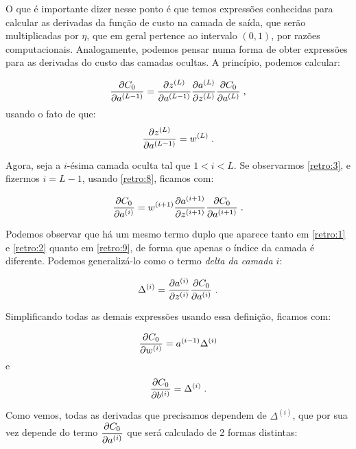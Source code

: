 O que é importante dizer nesse ponto é que temos expressões conhecidas para calcular as derivadas da função de custo na camada de saída, que serão multiplicadas por $\eta$, que em geral pertence ao intervalo $(0,1)$, por razões computacionais. Analogamente, podemos pensar numa forma de obter expressões para as derivadas do custo das camadas ocultas. A princípio, podemos calcular:

\begin{equation}\label{retro:3}
\frac{\partial C_0}{\partial a^{(L-1)}} = \frac{\partial z^{(L)}}{\partial a^{(L-1)}} \frac{\partial a^{(L)}}{\partial z^{(L)}} \frac{\partial C_0}{\partial a^{(L)}} \; ,
\end{equation}
usando o fato de que:
\begin{equation}\label{retro:8}
\frac{\partial z^{(L)}}{\partial a^{(L-1)}} = w^{(L)} \; .
\end{equation}

Agora, seja a $i$-ésima camada oculta tal que $1 < i < L$. Se observarmos \eqref{retro:3}, e fizermos $i = L-1$, usando \eqref{retro:8}, ficamos com:

\begin{equation}\label{retro:9}
\frac{\partial C_0}{\partial a^{(i)}} = w^{(i+1)} \frac{\partial a^{(i+1)}}{\partial z^{(i+1)}} \frac{\partial C_0}{\partial a^{(i+1)}} \;.
\end{equation}

Podemos observar que há um mesmo termo duplo que aparece tanto em \eqref{retro:1} e \eqref{retro:2} quanto em \eqref{retro:9}, de forma que apenas o índice da camada é diferente. Podemos generalizá-lo como o termo \emph{delta da camada $i$}:

\begin{equation}\label{retro:12}
\Delta^{(i)} = \dfrac{\partial a^{(i)}}{\partial z^{(i)}} \dfrac{\partial C_0}{\partial a^{(i)}} \;.
\end{equation}

Simplificando todas as demais expressões usando essa definição, ficamos com:

\begin{equation}\label{retro:13}
\frac{\partial C_0}{\partial w^{(i)}} = a^{(i-1)} \Delta^{(i)}
\end{equation}
e
\begin{equation}\label{retro:14}
\frac{\partial C_0}{\partial b^{(i)}} = \Delta^{(i)} \;.
\end{equation}

Como vemos, todas as derivadas que precisamos dependem de $\Delta^{(i)}$, que por sua vez depende do termo $\dfrac{\partial C_0}{\partial a^{(i)}}$ que será calculado de 2 formas distintas:

